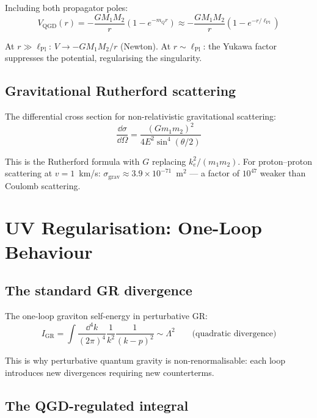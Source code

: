 \documentclass[11pt,a4paper]{article}
\theoremstyle{plain}
\theoremstyle{definition}
\theoremstyle{remark}
\newcommand{\mQ}{m_Q}
\newcommand{\lPl}{\ell_{\mathrm{Pl}}}
\begin{document}
Including both propagator poles:
\begin{equation}
  V_{\mathrm{QGD}}(r) = -\frac{GM_1M_2}{r}\left(1 - e^{-\mQ r}\right) \approx -\frac{GM_1M_2}{r}\left(1 - e^{-r/\lPl}\right)
\end{equation}

At $r \gg \lPl$: $V \to -GM_1M_2/r$ (Newton).  At $r \sim \lPl$: the Yukawa factor suppresses the potential, regularising the singularity.

\subsection{Gravitational Rutherford scattering}

The differential cross section for non-relativistic gravitational scattering:
\begin{equation}
  \frac{\dd\sigma}{\dd\Omega} = \frac{(Gm_1m_2)^2}{4E^2\sin^4(\theta/2)}
\end{equation}

This is the Rutherford formula with $G$ replacing $k_e^2/(m_1m_2)$.  For proton--proton scattering at $v = 1$~km/s: $\sigma_{\mathrm{grav}} \approx 3.9\times10^{-71}$~m$^2$ --- a factor of $10^{47}$ weaker than Coulomb scattering.

\section{UV Regularisation: One-Loop Behaviour}
\label{sec:uv}

\subsection{The standard GR divergence}

The one-loop graviton self-energy in perturbative GR:
\begin{equation}
  I_{\mathrm{GR}} = \int\frac{\dd^4k}{(2\pi)^4}\frac{1}{k^2}\frac{1}{(k-p)^2} \sim \Lambda^2 \qquad\text{(quadratic divergence)}
\end{equation}

This is why perturbative quantum gravity is non-renormalisable: each loop introduces new divergences requiring new counterterms.

\subsection{The QGD-regulated integral}
\end{document}
